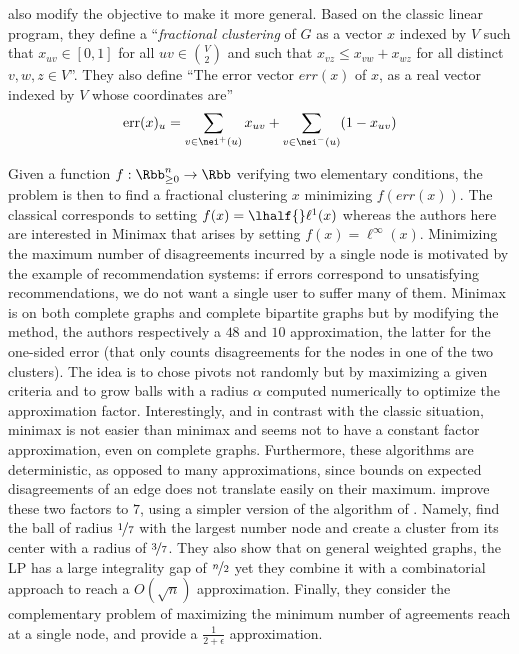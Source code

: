 \Textcite{pmlr-v48-puleo16} also modify the \mind{} objective to make it more general. Based on the
classic \pcc{} linear program, they define a \enquote{\emph{fractional clustering} of $G$ as a
vector $x$ indexed by $V$ such that $x_{uv} \in [0, 1]$ for all $uv \in \binom{V}{2}$ and such that
$x_{vz} \leq x_{vw} + x_{wz}$ for all distinct $v, w, z \in V$}. They also define \enquote{The
error vector $err(x)$ of $x$, as a real vector indexed by $V$ whose coordinates are}
\begin{equation*}
  \mathrm{err}(x)_u = \sum_{v\in\nei^+(u)} x_{uv} + \sum_{v\in\nei^-(u)} (1-x_{uv})
\end{equation*}

Given a function $f: \Rbb^n_{\geq 0} \rightarrow \Rbb$ verifying two elementary conditions, the
problem is then to find a fractional clustering $x$ minimizing $f(err(x))$. The classical \pcc{}
corresponds to setting $f(x) = \lhalf{}\ell^1(x)$ whereas the authors here are interested in Minimax
\pcc{} that arises by setting $f(x) = \ell^\infty(x)$. Minimizing the maximum number of
disagreements incurred by a single node is motivated by the example of recommendation systems: if
errors correspond to unsatisfying recommendations, we do not want a single user to suffer many
of them. Minimax \pcc{} is \NPc{} on both complete graphs and complete bipartite graphs but
by modifying the \regionGrow{} method, the authors respectively a $48$ and
$10$ approximation, the latter for the one-sided error (that only counts disagreements for the nodes
in one of the two clusters).
The idea is to chose pivots not randomly but by maximizing a given criteria and
to grow balls with a radius $\alpha$ computed numerically to optimize the approximation factor.
Interestingly, and in contrast with the classic \pcc{} situation, minimax \maxa{} is not easier than
minimax \mind{} and seems not to have a constant factor approximation, even on complete graphs.
Furthermore, these algorithms are deterministic, as opposed to many \pcc{} approximations, since
bounds on expected disagreements of an edge does not translate easily on their maximum.
\Textcite{Charikar2017} improve these two factors to $7$, using a simpler version of the algorithm
of \textcite{pmlr-v48-puleo16}. Namely, find the ball of radius $\nicefrac{1}{7}$ with the largest
number node and create a cluster from its center with a radius of $\nicefrac{3}{7}$. They also show
that on general weighted graphs, the LP has a large integrality gap of $\nicefrac{n}{2}$ yet they
combine it with a combinatorial approach to reach a $O(\sqrt{n})$ approximation. Finally, they
consider the complementary problem of maximizing the minimum number of agreements reach at a single
node, and provide a $\frac{1}{2+\epsilon}$ approximation.


